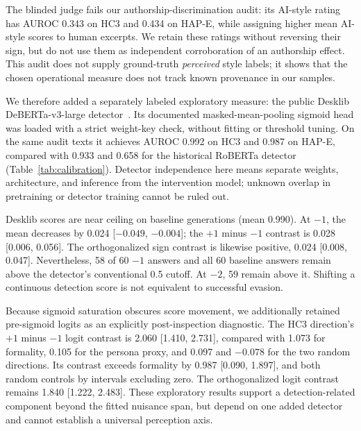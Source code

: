 The blinded judge fails our authorship-discrimination audit: its AI-style rating has AUROC 0.343 on HC3 and 0.434 on HAP-E, while assigning higher mean AI-style scores to human excerpts. We retain these ratings without reversing their sign, but do not use them as independent corroboration of an authorship effect. This audit does not supply ground-truth \emph{perceived} style labels; it shows that the chosen operational measure does not track known provenance in our samples.

We therefore added a separately labeled exploratory measure: the public Desklib DeBERTa-v3-large detector~\cite{desklib}. Its documented masked-mean-pooling sigmoid head was loaded with a strict weight-key check, without fitting or threshold tuning. On the same audit texts it achieves AUROC 0.992 on HC3 and 0.987 on HAP-E, compared with 0.933 and 0.658 for the historical RoBERTa detector (Table~\ref{tab:calibration}). Detector independence here means separate weights, architecture, and inference from the intervention model; unknown overlap in pretraining or detector training cannot be ruled out.

\begin{table}[t]
\centering\scriptsize
\caption{Independent-measure audit on held-out natural texts. HC3 has 80 human/machine pairs; HAP-E has 30 document triplets. Intervals resample pairs/documents. Desklib was an exploratory addition.}
\label{tab:calibration}
\end{table}

Desklib scores are near ceiling on baseline generations (mean 0.990). At $-1$, the mean decreases by 0.024 [$-0.049$, $-0.004$]; the $+1$ minus $-1$ contrast is 0.028 [0.006, 0.056]. The orthogonalized sign contrast is likewise positive, 0.024 [0.008, 0.047]. Nevertheless, 58 of 60 $-1$ answers and all 60 baseline answers remain above the detector's conventional 0.5 cutoff. At $-2$, 59 remain above it. Shifting a continuous detection score is not equivalent to successful evasion.

Because sigmoid saturation obscures score movement, we additionally retained pre-sigmoid logits as an explicitly post-inspection diagnostic. The HC3 direction's $+1$ minus $-1$ logit contrast is 2.060 [1.410, 2.731], compared with 1.073 for formality, 0.105 for the persona proxy, and 0.097 and $-0.078$ for the two random directions. Its contrast exceeds formality by 0.987 [0.090, 1.897], and both random controls by intervals excluding zero. The orthogonalized logit contrast remains 1.840 [1.222, 2.483]. These exploratory results support a detection-related component beyond the fitted nuisance span, but depend on one added detector and cannot establish a universal perception axis.

